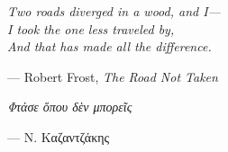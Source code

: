 \thispagestyle{empty}
\mbox{}
\begin{flushright}

{\selectfont
  \vspace{6cm}

  \it{
    Two roads diverged in a wood, and I— \\
    I took the one less traveled by, \\
    And that has made all the difference. \\
  }
  
  --- \textup{Robert Frost}, \textit{The Road Not Taken}

  \vspace{3cm}

  \it{
    Φτάσε ὅπου δὲν μπορεῖς \\
  }

  --- \textup{Ν. Καζαντζάκης}






}
\end{flushright}
